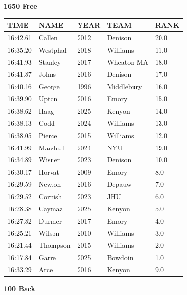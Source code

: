\begin{table}[H]
\centering
\begin{minipage}[t]{0.48\textwidth}
\centering
\textbf{1650 Free}\\[0.1cm]
\begin{tabular}{@{}p{1.8cm}p{2.8cm}p{1.2cm}p{1.4cm}p{0.8cm}@{}}
\hline
    \textbf{TIME} & \textbf{NAME} & \textbf{YEAR} & \textbf{TEAM} & \textbf{RANK} \\
\hline
    16:42.61 & Callen & 2012 & Denison & 20.0 \\
    16:35.20 & Westphal & 2018 & Williams & 11.0 \\
    16:41.93 & Stanley & 2017 & Wheaton MA & 18.0 \\
    16:41.87 & Johns & 2016 & Denison & 17.0 \\
    16:40.16 & George & 1996 & Middlebury & 16.0 \\
    16:39.90 & Upton & 2016 & Emory & 15.0 \\
    16:38.62 & Haag & 2025 & Kenyon & 14.0 \\
    16:38.13 & Codd & 2024 & Williams & 13.0 \\
    16:38.05 & Pierce & 2015 & Williams & 12.0 \\
    16:41.99 & Marshall & 2024 & NYU & 19.0 \\
    16:34.89 & Wisner & 2023 & Denison & 10.0 \\
    16:30.17 & Horvat & 2009 & Emory & 8.0 \\
    16:29.59 & Newlon & 2016 & Depauw & 7.0 \\
    16:29.52 & Cornish & 2023 & JHU & 6.0 \\
    16:28.38 & Caymaz & 2025 & Kenyon & 5.0 \\
    16:27.82 & Durmer & 2017 & Emory & 4.0 \\
    16:25.21 & Wilson & 2010 & Williams & 3.0 \\
    16:21.44 & Thompson & 2015 & Williams & 2.0 \\
    16:17.84 & Garre & 2025 & Bowdoin & 1.0 \\
    16:33.29 & Arce & 2016 & Kenyon & 9.0 \\
\hline
\end{tabular}
\end{minipage}\hfill
\begin{minipage}[t]{0.48\textwidth}
\centering
\textbf{100 Back}\\[0.1cm]
\begin{tabular}{@{}p{1.8cm}p{2.8cm}p{1.2cm}p{1.4cm}p{0.8cm}@{}}

\end{tabular}
\end{minipage}
\end{table}
